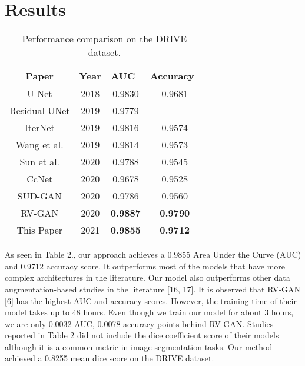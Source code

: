 \documentclass{article}
\begin{document}
\section{Results}
\begin{table}\caption{Performance comparison on the DRIVE dataset.} \centering \begin{tabular}{c c c c} \hline\hline Paper & Year & AUC\ & Accuracy\ \\ [0.5ex] \hline U-Net \cite{Jin_2019} & 2018 & 0.9830 & 0.9681\\ Residual UNet \cite{8803101} & 2019 & 0.9779 & - \\
IterNet \cite{li2019iternet} & 2019 & 0.9816 & 0.9574  \\
Wang et al. \cite{10.1145/3348416.3348425} & 2019 & 0.9814 & 0.9573 \\
Sun et al. \cite{sun2020robust} & 2020 & 0.9788 & 0.9545\\
CcNet \cite{FENG2020268} & 2020 & 0.9678 & 0.9528 \\
SUD-GAN \cite{sudgan} & 2020 & 0.9786 & 0.9560 \\
RV-GAN \cite{kamran2021rvgan} & 2020 &\textbf{0.9887} & \textbf{0.9790}\\
This Paper & 2021 & \textbf{0.9855} & \textbf{0.9712}  \\ [1ex] \hline \end{tabular}
\label{table:nonlin} \end{table}
As seen in Table 2., our approach achieves a 0.9855 Area Under the Curve (AUC) and 0.9712 accuracy score. It outperforms most of the models that have more complex architectures in the literature. Our model also outperforms other data augmentation-based studies in the literature [16, 17]. It is observed that RV-GAN [6] has the highest AUC and accuracy scores. However, the training time of their model takes up to 48 hours. Even though we train our model for about 3 hours, we are only 0.0032 AUC, 0.0078 accuracy points behind RV-GAN. Studies reported in Table 2 did not include the dice coefficient score of their models although it is a common metric in image segmentation tasks. Our method achieved a 0.8255 mean dice score on the DRIVE dataset.
\end{document}
